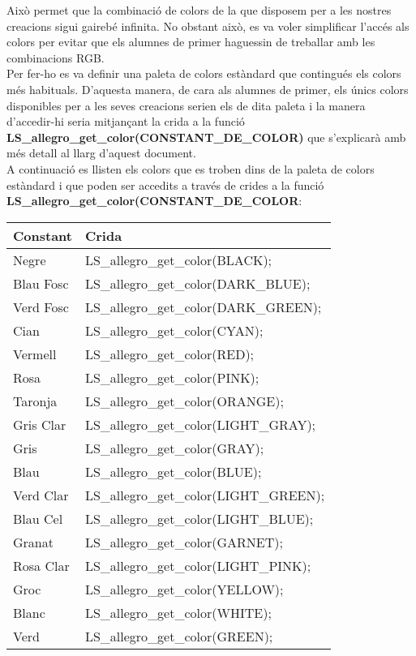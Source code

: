 \documentclass[11pt]{article}
\begin{document}
\noindent Això permet que la combinació de colors de la que disposem per a les nostres creacions sigui gairebé infinita. No obstant això, es va voler simplificar l'accés als colors per evitar que els alumnes de primer haguessin de treballar amb les combinacions RGB.\\

\noindent Per fer-ho es va definir una paleta de colors estàndard que contingués els colors més habituals. D'aquesta manera, de cara als alumnes de primer, els únics colors disponibles per a les seves creacions serien els de dita paleta i la manera d'accedir-hi seria mitjançant la crida a la funció \textbf{LS\_allegro\_get\_color(CONSTANT\_DE\_COLOR)} que s'explicarà amb més detall al llarg d'aquest document.\\

\noindent A continuació es llisten els colors que es troben dins de la paleta de colors estàndard i que poden ser accedits a través de crides a la funció \textbf{LS\_allegro\_get\_color(CONSTANT\_DE\_COLOR}:
\begin{center}
	\begin{tabular}{| l | l |}
		\hline
		Constant & Crida\\
		\hline                      
  		Negre & LS\_allegro\_get\_color(BLACK); \\
  		\hline
  		Blau Fosc & LS\_allegro\_get\_color(DARK\_BLUE); \\
  		\hline
  		Verd Fosc & LS\_allegro\_get\_color(DARK\_GREEN); \\
  		\hline
  		Cian & LS\_allegro\_get\_color(CYAN); \\
  		\hline
  		Vermell & LS\_allegro\_get\_color(RED); \\
  		\hline
  		Rosa & LS\_allegro\_get\_color(PINK); \\
  		\hline
  		Taronja & LS\_allegro\_get\_color(ORANGE); \\
  		\hline
  		Gris Clar & LS\_allegro\_get\_color(LIGHT\_GRAY); \\
  		\hline
  		Gris & LS\_allegro\_get\_color(GRAY); \\
  		\hline
  		Blau & LS\_allegro\_get\_color(BLUE); \\
  		\hline
  		Verd Clar & LS\_allegro\_get\_color(LIGHT\_GREEN); \\
  		\hline
  		Blau Cel & LS\_allegro\_get\_color(LIGHT\_BLUE); \\
  		\hline
  		Granat & LS\_allegro\_get\_color(GARNET); \\
  		\hline
  		Rosa Clar & LS\_allegro\_get\_color(LIGHT\_PINK); \\
  		\hline
  		Groc & LS\_allegro\_get\_color(YELLOW); \\
  		\hline
  		Blanc & LS\_allegro\_get\_color(WHITE); \\
  		\hline
  		Verd & LS\_allegro\_get\_color(GREEN); \\
  		\hline  
	\end{tabular}
\end{center}
\end{document}
